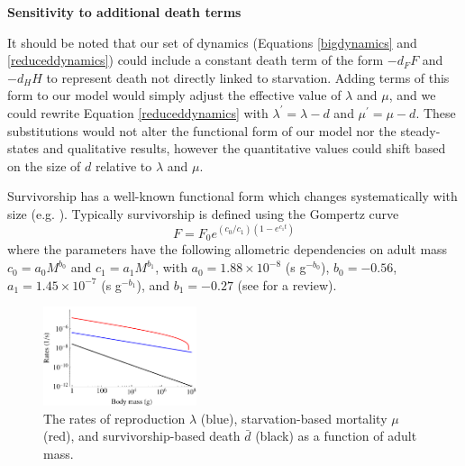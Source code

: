 \documentclass[twocolumn,preprintnumbers,amsmath,amssymb,superscriptaddress]{revtex4}
\begin{document}
\begin{bibunit}[unsrt]
{\bf Sensitivity to additional death terms}

It should be noted that our set of dynamics (Equations \ref{bigdynamics} and \ref{reduceddynamics}) could include a constant death term of the form $-d_{F}F$ and $-d_{H}H$ to represent death not directly linked to starvation. Adding terms of this form to our model would simply adjust the effective value of $\lambda$ and $\mu$, and we could rewrite Equation \ref{reduceddynamics} with $\lambda^{\prime}=\lambda-d$ and $\mu^{\prime}=\mu-d$. These substitutions would not alter the functional form of our model nor the steady-states and qualitative results, however the quantitative values could shift based on the size of $d$ relative to $\lambda$ and $\mu$. 

Survivorship has a well-known functional form which changes systematically with size (e.g. \cite{calder1984}). Typically survivorship is defined using the Gompertz curve 
\begin{equation}
F=F_{0}e^{\left(c_{0}/c_{1}\right)\left(1-e^{c_{1}t}\right)}
\label{gompertz}
\end{equation}
where the parameters have the following allometric dependencies on adult mass $c_{0}=a_{0}M^{b_{0}}$ and $c_{1}=a_{1}M^{b_{1}}$, with $a_{0}=1.88\times10^{-8}$ (s g$^{-b_{0}}$), $b_{0}=-0.56$, $a_{1}=1.45\times10^{-7}$ (s g$^{-b_{1}}$), and $b_{1}=-0.27$ (see \cite{calder1984} for a review).

\begin{figure}
\centering
\includegraphics[width=0.4\textwidth]{mortality-rate-comparison-eps-converted-to.pdf}
\caption{\small{The rates of reproduction $\lambda$ (blue), starvation-based mortality $\mu$ (red), and survivorship-based death $\bar{d}$ (black) as a function of adult mass.}\label{fig:ratescomp}}
\end{figure}


\end{bibunit}
\end{document}

